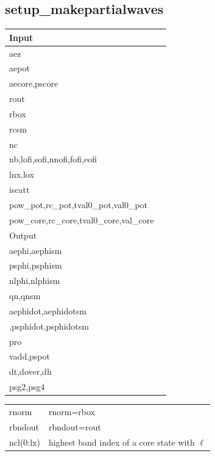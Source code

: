 \documentclass[11pt,a4paper]{report}
\begin{document}
\subsection{setup\_makepartialwaves}
\begin{center}
\begin{tabular}{|l|l|}
\hline
\multicolumn{2}{|l|}{Input}\\
\hline
aez    & \\
aepot  & \\
aecore,pscore & \\
rout   & \\
rbox   & \\
rcsm   & \\
nc     & \\
nb,lofi,sofi,nnofi,fofi,eofi &\\
lnx,lox &\\
iscatt &\\
pow\_pot,rc\_pot,tval0\_pot,val0\_pot &\\
pow\_core,rc\_core,tval0\_core,val\_core &\\
\hline
\hline
\multicolumn{2}{|l|}{Output}\\
\hline
aephi,aephism &\\
psphi,psphism &\\
nlphi,nlphism &\\
qn,qnsm       &\\
aephidot,aephidotsm &\\
,psphidot,psphidotsm &\\
pro         &\\
vadd,pspot &\\
dt,dover,dh &\\
psg2,psg4 & \\
\hline
\end{tabular}
\end{center}



\begin{center}
\begin{tabular}{|l|l|}
\hline
rnorm & rnorm=rbox\\
rbndout &rbndout=rout\\
ncl(0:lx)  & highest band index of a core state with $\ell$\\
\hline
\end{tabular}
\end{center}
\end{document}

